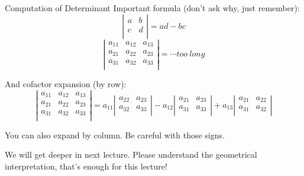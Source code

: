\documentclass{beamer}
\begin{document}
\begin{frame}{Computation of Determinant}
Important formula (don't ask why, just remember):
\begin{equation*}
    \left| \begin{matrix}
        a&		b\\
        c&		d\\
    \end{matrix} \right|=ad-bc
\end{equation*}
\begin{equation*}
    \left| \begin{matrix}
        a_{11}&		a_{12}&		a_{13}\\
        a_{21}&		a_{22}&		a_{23}\\
        a_{31}&		a_{32}&		a_{33}\\
    \end{matrix} \right|= \cdots too\:long
\end{equation*}

And cofactor expansion (by row):
\begin{equation*}
    \left| \begin{matrix}
        a_{11}&		a_{12}&		a_{13}\\
        a_{21}&		a_{22}&		a_{23}\\
        a_{31}&		a_{32}&		a_{33}\\
    \end{matrix} \right|=a_{11}\left| \begin{matrix}
        a_{22}&		a_{23}\\
        a_{32}&		a_{33}\\
    \end{matrix} \right|-a_{12}\left| \begin{matrix}
        a_{21}&		a_{23}\\
        a_{31}&		a_{33}\\
    \end{matrix} \right|+a_{13}\left| \begin{matrix}
        a_{21}&		a_{22}\\
        a_{31}&		a_{32}\\
    \end{matrix} \right|
\end{equation*}

You can also expand by column. Be careful with those signs.

\vspace{3pt}
We will get deeper in next lecture. Please understand the geometrical interpretation, that's enough for this lecture!
\end{frame}
\end{document}
